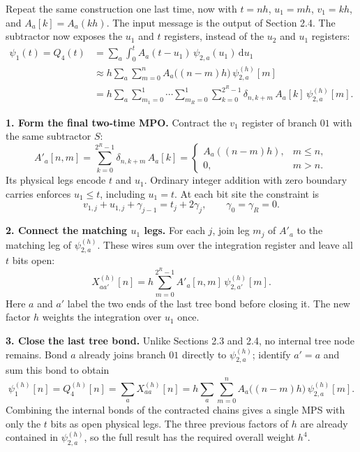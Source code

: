 \documentclass[11pt,a4paper]{article}
\newcommand{\subhead}[1]{\par\Needspace{4\baselineskip}\smallskip{\large\sffamily\bfseries\color{DeepBlue}#1\par}}
\begin{document}
\subhead{2.5\quad Express \(\psi_1(t)=Q_4(t)\) in terms of \(\psi_{2,a}(u_1)\)}
Repeat the same construction one last time, now with \(t=nh\), \(u_1=mh\),
\(v_1=kh\), and \(A_a[k]=A_a(kh)\). The input message is the output of
Section 2.4. The subtractor now exposes the \(u_1\) and \(t\) registers,
instead of the \(u_2\) and \(u_1\) registers:
\[
\begin{aligned}
 \psi_1(t)=Q_4(t)
 &=\sum_a\int_0^t A_a(t-u_1)\,\psi_{2,a}(u_1)\,\mathrm{d}u_1\\
 &\approx h\sum_a\sum_{m=0}^{n}
 A_a\bigl((n-m)h\bigr)\,\psi_{2,a}^{(h)}[m]\\
 &=h\sum_a\sum_{m_1=0}^1\cdots\sum_{m_R=0}^1
 \sum_{k=0}^{2^R-1}\delta_{n,k+m}\,A_a[k]\,\psi_{2,a}^{(h)}[m].
\end{aligned}
\]

\textbf{1. Form the final two-time MPO.}
Contract the \(v_1\) register of branch \(01\) with the same subtractor \(S\):
\[
 A'_a[n,m]=\sum_{k=0}^{2^R-1}\delta_{n,k+m}\,A_a[k]
 =\begin{cases}A_a((n-m)h),&m\le n,\\0,&m>n.\end{cases}
\]
Its physical legs encode \(t\) and \(u_1\). Ordinary integer addition with
zero boundary carries enforces \(u_1\le t\), including \(u_1=t\).
At each bit site the constraint is
\[
 v_{1,j}+u_{1,j}+\gamma_{j-1}=t_j+2\gamma_j,
 \qquad \gamma_0=\gamma_R=0.
\]

\textbf{2. Connect the matching \(u_1\) legs.}
For each \(j\), join leg \(m_j\) of \(A'_a\) to the matching leg of
\(\psi_{2,a}^{(h)}\). These wires sum over the integration register and leave
all \(t\) bits open:
\[
 X_{aa'}^{(h)}[n]
 =h\sum_{m=0}^{2^R-1}A'_a[n,m]\,\psi_{2,a'}^{(h)}[m].
\]
Here \(a\) and \(a'\) label the two ends of the last tree bond before closing
it. The new factor \(h\) weights the integration over \(u_1\) once.

\textbf{3. Close the last tree bond.}
Unlike Sections 2.3 and 2.4, no internal tree node remains. Bond \(a\)
already joins branch \(01\) directly to \(\psi_{2,a}^{(h)}\); identify
\(a'=a\) and sum this bond to obtain
\[
 \boxed{\psi_1^{(h)}[n]=Q_4^{(h)}[n]
 =\sum_a X_{aa}^{(h)}[n]
 =h\sum_a\sum_{m=0}^{n}
 A_a\bigl((n-m)h\bigr)\,\psi_{2,a}^{(h)}[m].}
\]
Combining the internal bonds of the contracted chains gives a single MPS
with only the \(t\) bits as open physical legs. The three previous factors
of \(h\) are already contained in \(\psi_{2,a}^{(h)}\), so the full result
has the required overall weight \(h^4\).
\end{document}
